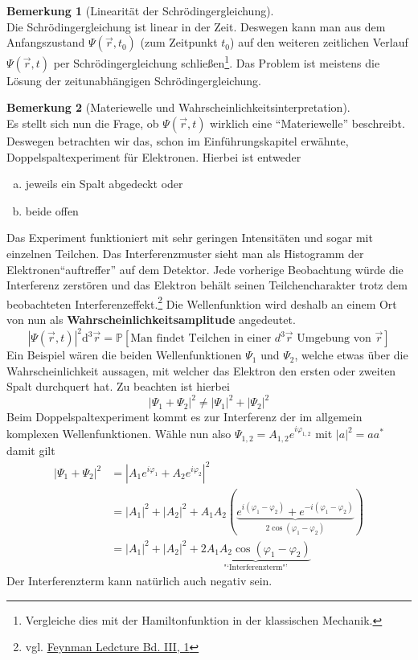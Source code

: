 \documentclass[oneside]{book}
\theoremstyle{definition}
\newtheorem*{bemerkung*}{Bemerkung}
\renewcommand{\d}{\mathrm d}
\newcommand{\vp}{\varphi}
\begin{document}
\begin{bemerkung*}[Linearität der Schrödingergleichung]~\\
	Die Schrödingergleichung ist linear in der Zeit. Deswegen kann man aus dem Anfangszustand $\Psi(\vec{r}, t_0)$ (zum Zeitpunkt $t_0$) auf den weiteren zeitlichen Verlauf $\Psi(\vec{r}, t)$ per Schrödingergleichung schließen\footnote{Vergleiche dies mit der Hamiltonfunktion in der klassischen Mechanik.}. Das Problem ist meistens die Lösung der zeitunabhängigen Schrödingergleichung.
\end{bemerkung*}
\begin{bemerkung*}[Materiewelle und Wahrscheinlichkeitsinterpretation]~\\
	Es stellt sich nun die Frage, ob $\Psi(\vec{r}, t)$ wirklich eine "`Materiewelle"' beschreibt. Deswegen betrachten wir das, schon im Einführungskapitel erwähnte, Doppelspaltexperiment für Elektronen. Hierbei ist entweder
	\begin{enumerate}[a)]
		\item jeweils ein Spalt abgedeckt oder
		\item beide offen
	\end{enumerate}
	Das Experiment funktioniert mit sehr geringen Intensitäten und sogar mit einzelnen Teilchen. Das Interferenzmuster sieht man als Histogramm der Elektronen"`auftreffer"' auf dem Detektor. Jede vorherige Beobachtung würde die Interferenz zerstören und das Elektron behält seinen Teilchencharakter trotz dem beobachteten Interferenzeffekt.\footnote{vgl. \href{http://www.feynmanlectures.caltech.edu/III\_01.html\#Ch1\-S1}{Feynman Ledcture Bd. III, 1}} Die Wellenfunktion wird deshalb an einem Ort von nun als \textbf{Wahrscheinlichkeitsamplitude} angedeutet.
	$$|\Psi(\vec{r}, t)|^2 \d^3 \vec{r} = \mathbb{P}[\text{Man findet Teilchen in einer $d^3 \vec{r}$ Umgebung von $\vec{r}$}]$$
	Ein Beispiel wären die beiden Wellenfunktionen $\Psi_{1}$ und $\Psi_2$, welche etwas über die Wahrscheinlichkeit aussagen, mit welcher das Elektron den ersten oder zweiten Spalt durchquert hat. Zu beachten ist hierbei
	$$|\Psi_1 + \Psi_2|^2 \neq |\Psi_1|^2 + |\Psi_2|^2$$
	Beim Doppelspaltexperiment kommt es zur Interferenz der im allgemein komplexen Wellenfunktionen. Wähle nun also $\Psi_{1,2}= A_{1,2} e^{i\vp_{1,2}}$ mit $|a|^2 = a a^\ast$ damit gilt
	\begin{align*}
		|\Psi_1 + \Psi_2|^2 &= |A_1 e^{i\vp_1} + A_2 e^{i \vp_2}|^2\\
		&= |A_1|^2 + |A_2|^2 + A_1 A_2 (\underbrace{e^{i(\vp_1 - \vp_2)} + e^{-i(\vp_1 - \vp_2)}}_{2\cos(\vp_1 - \vp_2)})\\
		&= |A_1|^2 + |A_2|^2 + \underbrace{2 A_1 A_2 \cos(\vp_1 - \vp_2)}_{\text{"`Interferenzterm"'}}
	\end{align*}
	Der Interferenzterm kann natürlich auch negativ sein.
\end{bemerkung*}
\end{document}
